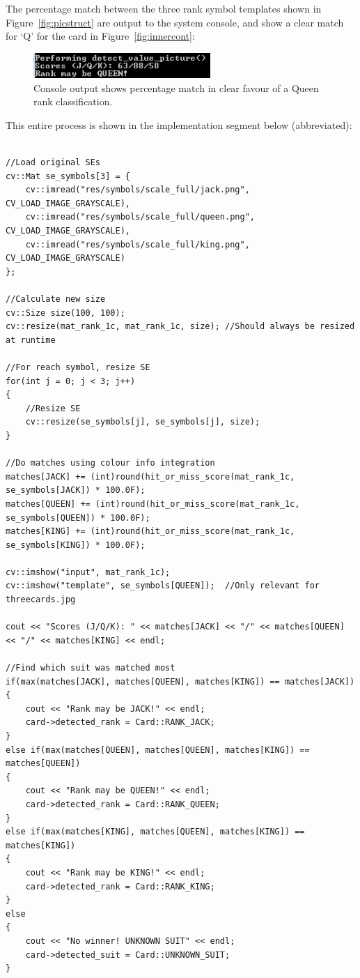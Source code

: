 \documentclass[a4paper,12pt,notitlepage]{article}
\begin{document}
			The percentage match between the three rank symbol templates shown in Figure~\ref{fig:picstruct} are output to the system console, and show a clear match for `Q' for the card in Figure~\ref{fig:innercont}:

			\begin{figure}[H]
				\centering
				\includegraphics[width=0.6\textwidth]{chris/image27}
				\caption{Console output shows percentage match in clear favour of a Queen rank classification.}
				\label{fig:console}
			\end{figure}

			This entire process is shown in the implementation segment below (abbreviated):

			\begin{lstlisting}

//Load original SEs
cv::Mat se_symbols[3] = {
    cv::imread("res/symbols/scale_full/jack.png", CV_LOAD_IMAGE_GRAYSCALE),
    cv::imread("res/symbols/scale_full/queen.png", CV_LOAD_IMAGE_GRAYSCALE),
    cv::imread("res/symbols/scale_full/king.png", CV_LOAD_IMAGE_GRAYSCALE)
};

//Calculate new size
cv::Size size(100, 100);
cv::resize(mat_rank_1c, mat_rank_1c, size); //Should always be resized at runtime

//For reach symbol, resize SE
for(int j = 0; j < 3; j++)
{
    //Resize SE
    cv::resize(se_symbols[j], se_symbols[j], size); 
}

//Do matches using colour info integration
matches[JACK] += (int)round(hit_or_miss_score(mat_rank_1c, se_symbols[JACK]) * 100.0F);
matches[QUEEN] += (int)round(hit_or_miss_score(mat_rank_1c, se_symbols[QUEEN]) * 100.0F);
matches[KING] += (int)round(hit_or_miss_score(mat_rank_1c, se_symbols[KING]) * 100.0F);

cv::imshow("input", mat_rank_1c);
cv::imshow("template", se_symbols[QUEEN]);  //Only relevant for threecards.jpg

cout << "Scores (J/Q/K): " << matches[JACK] << "/" << matches[QUEEN] << "/" << matches[KING] << endl;

//Find which suit was matched most
if(max(matches[JACK], matches[QUEEN], matches[KING]) == matches[JACK])
{
    cout << "Rank may be JACK!" << endl;
    card->detected_rank = Card::RANK_JACK;
}
else if(max(matches[QUEEN], matches[QUEEN], matches[KING]) == matches[QUEEN])
{
    cout << "Rank may be QUEEN!" << endl;
    card->detected_rank = Card::RANK_QUEEN;
}
else if(max(matches[KING], matches[QUEEN], matches[KING]) == matches[KING])
{
    cout << "Rank may be KING!" << endl;
    card->detected_rank = Card::RANK_KING;
}
else
{
    cout << "No winner! UNKNOWN SUIT" << endl;
    card->detected_suit = Card::UNKNOWN_SUIT;
}
			\end{lstlisting}
\end{document}
